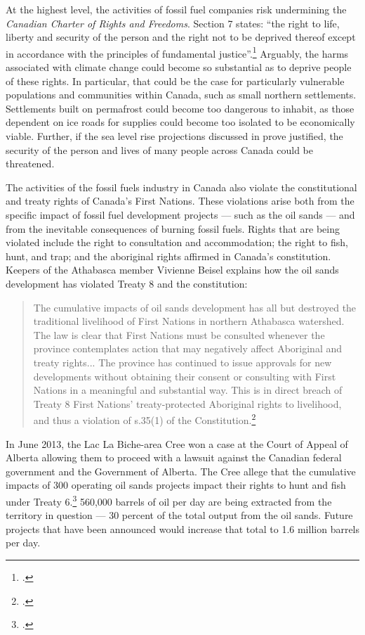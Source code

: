 At the highest level, the activities of fossil fuel companies risk undermining the \emph{Canadian Charter of Rights and Freedoms}.  
Section 7 states: ``the right to life, liberty and security of the person and the right not to be deprived thereof except in accordance with the principles of fundamental justice''.\footcite[][]{CharterRF}
Arguably, the harms associated with climate change could become so substantial as to deprive people of these rights.
In particular, that could be the case for particularly vulnerable populations and communities within Canada, such as small northern settlements.
Settlements built on permafrost could become too dangerous to inhabit, as those dependent on ice roads for supplies could become too isolated to be economically viable.
Further, if the sea level rise projections discussed in  prove justified, the security of the person and lives of many people across Canada could be threatened.



The activities of the fossil fuels industry in Canada also violate the constitutional and treaty rights of Canada's First Nations.
These violations arise both from the specific impact of fossil fuel development projects --- such as the oil sands --- and from the inevitable consequences of burning fossil fuels.
Rights that are being violated include the right to consultation and accommodation; the right to fish, hunt, and trap; and the aboriginal rights affirmed in Canada's constitution.
Keepers of the Athabasca member Vivienne Beisel explains how the oil sands development has violated Treaty 8 and the constitution:
\begin{quote}
The cumulative impacts of oil sands development has all but destroyed the traditional livelihood of First Nations in northern Athabasca watershed. The law is clear that First Nations must be consulted whenever the province contemplates action that may negatively affect Aboriginal and treaty rights... The province has continued to issue approvals for new developments without obtaining their consent or consulting with First Nations in a meaningful and substantial way. This is in direct breach of Treaty 8 First Nations' treaty-protected Aboriginal rights to livelihood, and thus a violation of s.35(1) of the Constitution.\footcite[][]{PassingNoNewOilSandsApprovalsResolution}
\end{quote}
In June 2013, the Lac La Biche-area Cree won a case at the Court of Appeal of Alberta allowing them to proceed with a lawsuit against the Canadian federal government and the Government of Alberta.
The Cree allege that the cumulative impacts of 300 operating oil sands projects impact their rights to hunt and fish under Treaty 6.\footcite[][]{BandWinsTreatyRights}
560,000 barrels of oil per day are being extracted from the territory in question --- 30 percent of the total output from the oil sands.
Future projects that have been announced would increase that total to 1.6 million barrels per day.



